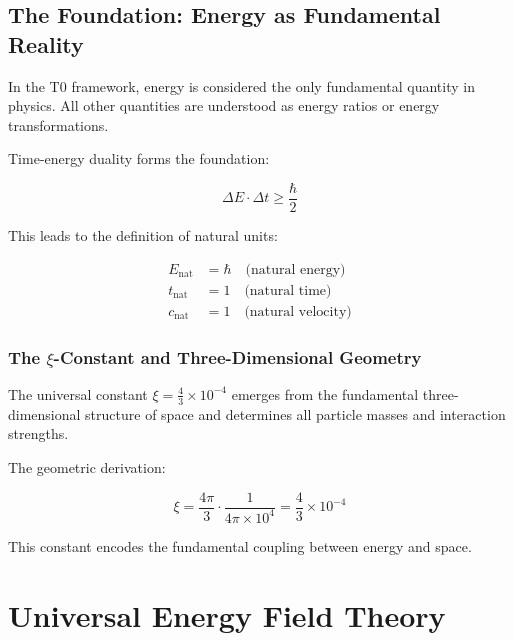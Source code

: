 	\section{The Foundation: Energy as Fundamental Reality}
	
	\begin{principle}
		In the T0 framework, energy is considered the only fundamental quantity in physics. All other quantities are understood as energy ratios or energy transformations.
	\end{principle}
	
	Time-energy duality forms the foundation:
	
	\begin{equation}
		\Delta E \cdot \Delta t \geq \frac{\hbar}{2}
	\end{equation}
	
	This leads to the definition of natural units:
	
	\begin{align}
		E_{\text{nat}} &= \hbar \quad \text{(natural energy)} \\
		t_{\text{nat}} &= 1 \quad \text{(natural time)} \\
		c_{\text{nat}} &= 1 \quad \text{(natural velocity)}
	\end{align}
	
	\subsection{The $\xi$-Constant and Three-Dimensional Geometry}
	
	\begin{insight}
		The universal constant $\xi = \frac{4}{3} \times 10^{-4}$ emerges from the fundamental three-dimensional structure of space and determines all particle masses and interaction strengths.
	\end{insight}
	
	The geometric derivation:
	
	\begin{equation}
		\xi = \frac{4\pi}{3} \cdot \frac{1}{4\pi \times 10^4} = \frac{4}{3} \times 10^{-4}
	\end{equation}
	
	This constant encodes the fundamental coupling between energy and space.
	
	\chapter{Universal Energy Field Theory}
	

